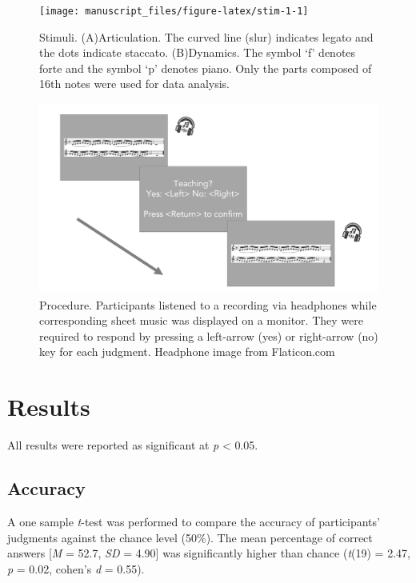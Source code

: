 \documentclass[
  man,floatsintext]{apa6}
\begin{document}
\begin{figure}
\texttt{[image: manuscript\_files/figure-latex/stim-1-1]} \caption{\label{fig:stim1}Stimuli. (A)Articulation. The curved line (slur) indicates legato and the dots indicate staccato. (B)Dynamics. The symbol `f' denotes forte and the symbol `p' denotes piano. Only the parts composed of 16th notes were used for data analysis.}\label{fig:stim-1}
\end{figure}

\begin{figure}

{\centering \includegraphics[width=0.5\linewidth]{image/procedure} 

}

\caption{\label{fig:procedure1}Procedure. Participants listened to a recording via headphones while corresponding sheet music was displayed on a monitor. They were required to respond by pressing a left-arrow (yes) or right-arrow (no) key for each judgment. Headphone image from Flaticon.com}\label{fig:procedure-1}
\end{figure}

\clearpage

\hypertarget{results}{%
\section{Results}\label{results}}

All results were reported as significant at \emph{p} \textless{} 0.05.

\hypertarget{accuracy-1}{%
\subsection{Accuracy}\label{accuracy-1}}

A one sample \emph{t}-test was performed to compare the accuracy of participants' judgments against the chance level (50\%). The mean percentage of correct answers {[}\emph{M} = 52.7, \emph{SD} = 4.90{]} was significantly higher than chance (\emph{t}(19) = 2.47, \emph{p} = 0.02, cohen's \emph{d} = 0.55).
\end{document}
